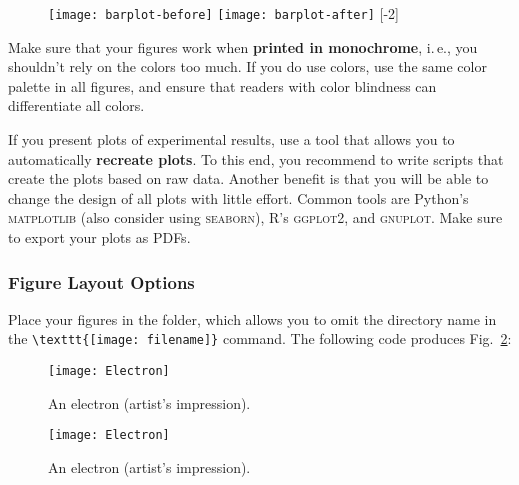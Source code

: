\begin{figure}[t]
\centering
\texttt{[image: barplot-before]}%
\hspace{\fill}%
\texttt{[image: barplot-after]}
[-2\baselineskip]
\end{figure}


Make sure that your figures work when \textbf{printed in monochrome}, i.\,e., you shouldn't rely on the colors too much. If you do use colors, use the same color palette in all figures, and ensure that readers with color blindness can differentiate all colors.

If you present plots of experimental results, use a tool that allows you to automatically \textbf{recreate plots}. To this end, you recommend to write scripts that create the plots based on raw data. Another benefit is that you will be able to change the design of all plots with little effort.%
Common tools are Python's \textsc{matplotlib} (also consider using \textsc{seaborn}), R's \textsc{ggplot2}, and \textsc{gnuplot}. Make sure to export your plots as PDFs.

\subsubsection{Figure Layout Options}

Place your figures in the  folder, which allows you to omit the directory name in the \verb|\texttt{[image: filename]}| command.
The following code produces Fig.~\ref{fig:Electron}:
\begin{latex}
\begin{figure}[t] %
\centering
\texttt{[image: Electron]}
\decoRule
\caption[An Electron]{An electron (artist's impression).}
\label{fig:Electron}
\end{figure}
\end{latex}

\begin{figure}[t] %
\centering
\texttt{[image: Electron]}
\decoRule
\caption[An Electron]{An electron (artist's impression).}
\label{fig:Electron}
\end{figure}

